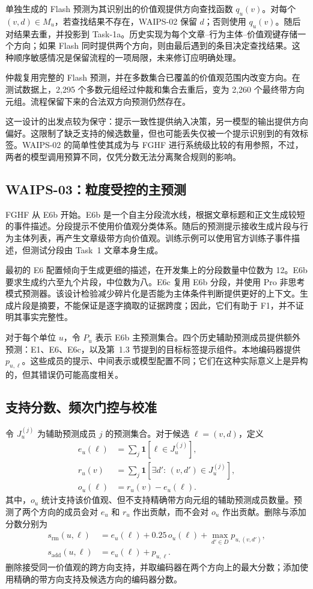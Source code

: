 \documentclass[12pt,a4paper]{article}
\begin{document}
单独生成的 Flash 预测为其识别出的价值观提供方向查找函数 $q_u(v)$。对每个 $(v,d)\in M_u$，若查找结果不存在，WAIPS-02 保留 $d$；否则使用 $q_u(v)$。随后对结果去重，并投影到 Task-1a。历史实现为每个文章--行为主体--价值观键存储一个方向；如果 Flash 同时提供两个方向，则由最后遇到的条目决定查找结果。这种顺序敏感情况是保留流程的一项局限，未来修订应明确处理。

仲裁复用完整的 Flash 预测，并在多数集合已覆盖的价值观范围内改变方向。在测试数据上，2,295 个多数元组经过仲裁和集合去重后，变为 2,260 个最终带方向元组。流程保留下来的合法双方向预测仍然存在。

这一设计的出发点较为保守：提示一致性提供纳入决策，另一模型的输出提供方向偏好。这限制了缺乏支持的候选数量，但也可能丢失仅被一个提示识别到的有效标签。WAIPS-02 的简单性使其成为与 FGHF 进行系统级比较的有用参照，不过，两者的模型调用预算不同，仅凭分数无法分离聚合规则的影响。

\subsection{WAIPS-03：粒度受控的主预测}
FGHF 从 E6b 开始。E6b 是一个自主分段流水线，根据文章标题和正文生成较短的事件描述。分段提示不使用价值观分类体系。随后的预测提示接收生成片段与行为主体列表，再产生文章级带方向价值观。训练示例可以使用官方训练子事件描述，但测试分段由 Task~1 文章本身生成。

最初的 E6 配置倾向于生成更细的描述，在开发集上的分段数量中位数为 12。E6b 要求生成约六至九个片段，中位数为八。E6c 复用 E6b 分段，并使用 Pro 非思考模式预测器。该设计检验减少碎片化是否能为主体条件判断提供更好的上下文。生成片段是摘要，不能保证是逐字摘取的证据跨度；因此，它们有助于 F1，并不证明其事实完整性。

对于每个单位 $u$，令 $P_u$ 表示 E6b 主预测集合。四个历史辅助预测成员提供额外预测：E1、E6、E6c，以及第~1.3 节提到的目标标签提示组件。本地编码器提供 $p_{u,\ell}$。这些成员的提示、中间表示或模型配置不同；它们在这种实际意义上是异构的，但其错误仍可能高度相关。

\subsection{支持分数、频次门控与校准}
令 $J_u^{(j)}$ 为辅助预测成员 $j$ 的预测集合。对于候选 $\ell=(v,d)$，定义
\begin{align}
e_u(\ell)&=\sum_j\mathbf{1}[\ell\in J_u^{(j)}],\\
r_u(v)&=\sum_j\mathbf{1}[\exists d'\!:\,(v,d')\in J_u^{(j)}],\\
o_u(\ell)&=r_u(v)-e_u(\ell).
\end{align}
其中，$o_u$ 统计支持该价值观、但不支持精确带方向元组的辅助预测成员数量。预测了两个方向的成员会对 $e_u$ 和 $r_u$ 作出贡献，而不会对 $o_u$ 作出贡献。删除与添加分数分别为
\begin{align}
s_{\mathrm{rm}}(u,\ell)&=e_u(\ell)+0.25\,o_u(\ell)+\max_{d'\in D}p_{u,(v,d')},\label{eq:removal}\\
s_{\mathrm{add}}(u,\ell)&=e_u(\ell)+p_{u,\ell}.\label{eq:addition}
\end{align}
删除接受同一价值观的跨方向支持，并取编码器在两个方向上的最大分数；添加使用精确的带方向支持及候选方向的编码器分数。
\end{document}
